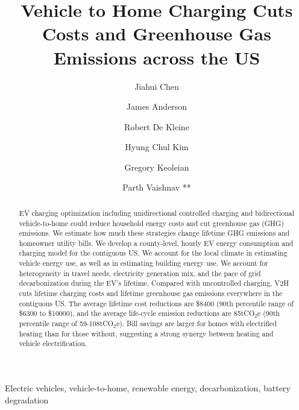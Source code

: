 \documentclass[11pt,preprint]{elsarticle}
\begin{document}
 
\begin{frontmatter}
	\title{Vehicle to Home Charging Cuts Costs and Greenhouse Gas Emissions across the US}
    \author[umichaddress]{Jiahui Chen}
    
    \author[fordaddress]{James Anderson}
    \author[fordaddress]{Robert De Kleine}
    \author[fordaddress]{Hyung Chul Kim}
    \author[umichaddress]{Gregory Keoleian}
    \author[umichaddress]{Parth Vaishnav **}
        \address[umichaddress]{School for Environment and Sustainability, University of Michigan, Ann Arbor, MI 48109, USA}
        \address[fordaddress]{Ford Research and Innovation Center, 2101 Village Rd, Dearborn, MI 48124, USA}
        
        
	\begin{abstract}
		EV charging optimization including unidirectional controlled charging and bidirectional vehicle-to-home could reduce household energy costs and cut greenhouse gas (GHG) emissions. We estimate how much these strategies change lifetime GHG emissions and homeowner utility bills. We develop a county-level, hourly EV energy consumption and charging model for the contiguous US. We account for the local climate in estimating vehicle energy use, as well as in estimating building energy use. We account for heterogeneity in travel needs, electricity generation mix, and the pace of grid decarbonization during the EV's lifetime. Compared with uncontrolled charging, V2H cuts lifetime charging costs and lifetime greenhouse gas emissions everywhere in the contiguous US. The average lifetime cost reductions are \$8400 (90th percentile range of \$6300 to \$10000), and the average life-cycle emission reductions are 85tCO$_2$e (90th percentile range of 59-108tCO$_2$e). Bill savings are larger for homes with electrified heating than for those without, suggesting a strong synergy between heating and vehicle electrification.
	\end{abstract}

	\begin{keyword}
		Electric vehicles, vehicle-to-home, renewable energy, decarbonization, battery degradation
	\end{keyword}


\end{frontmatter}

\newpage

\linenumbers
\end{document}
